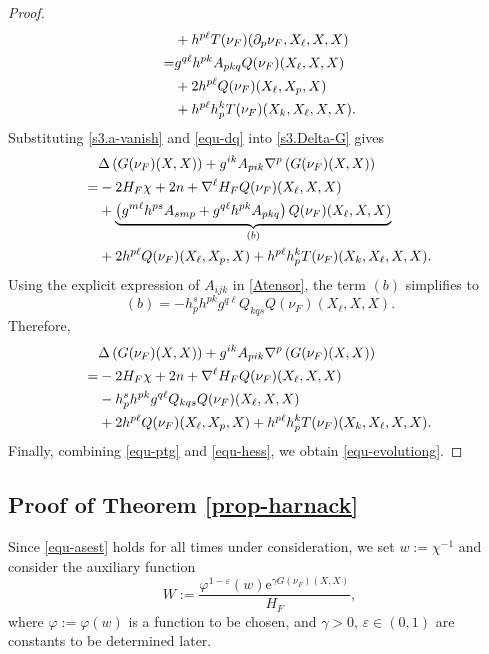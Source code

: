 \documentclass[10pt,a4paper]{amsart}
\numberwithin{equation}{section}
\begin{document}
\begin{proof}
\begin{align}
			&+ h^{p\ell}T(\nu_F)(\partial_p \nu_F,X_{\ell},X,X) \notag\\
			=& g^{q\ell}h^{pk}A_{pkq}Q(\nu_F)(X_{\ell},X,X) \nonumber\\
			&+ 2h^{p\ell}Q(\nu_F)(X_{\ell},X_{p},X) \notag\\
			& + h^{p\ell}h^k_p T(\nu_F)(X_k,X_{\ell},X,X). \label{equ-dq}
		\end{align}
        Substituting \eqref{s3.a-vanish} and \eqref{equ-dq} into \eqref{s3.Delta-G} gives
		\begin{align*}
			& \Delta\left( G(\nu_F)(X,X) \right) + g^{ik}A_{pik}\nabla^p\left( G(\nu_F)(X,X) \right) \notag\\
			=& -2H_F \chi + 2n + \nabla^{\ell}H_F Q(\nu_F)(X_{\ell},X,X) \nonumber\\
			& + \underbrace{\left(g^{m\ell}h^{ps}A_{smp}+g^{q\ell}h^{pk}A_{pkq}\right)Q(\nu_F)(X_{\ell},X,X)}_{(b)} \nonumber\\
			& + 2h^{p\ell}Q(\nu_F)(X_{\ell},X_{p},X) + h^{p\ell}h^k_p T(\nu_F)(X_k,X_{\ell},X,X).
		\end{align*}
		Using the explicit expression of $A_{ijk}$ in \eqref{Atensor}, the term $(b)$ simplifies to
		\begin{equation*}
			(b)	= -h^s_p h^{pk}g^{q\ell} Q_{kqs}Q(\nu_F)(X_{\ell},X,X).
		\end{equation*}
		Therefore,
		\begin{align}
			& \Delta\left( G(\nu_F)(X,X) \right) + g^{ik}A_{pik}\nabla^p\left( G(\nu_F)(X,X) \right) \notag\\
			=& -2H_F \chi + 2n + \nabla^{\ell}H_F Q(\nu_F)(X_{\ell},X,X) \nonumber\\
			& -h^s_p h^{pk}g^{q\ell} Q_{kqs}Q(\nu_F)(X_{\ell},X,X) \nonumber\\
			& + 2h^{p\ell}Q(\nu_F)(X_{\ell},X_{p},X) + h^{p\ell}h^k_p T(\nu_F)(X_k,X_{\ell},X,X). \label{equ-hess}
		\end{align}		
		Finally, combining \eqref{equ-ptg} and \eqref{equ-hess}, we obtain \eqref{equ-evolutiong}. 
	\end{proof}
	
	\subsection{Proof of Theorem \ref{prop-harnack}}
	
		Since \eqref{equ-asest} holds for all times under consideration, we set $w:=\chi^{-1}$ and consider the auxiliary function
		\begin{equation}
			\label{equ-W}
			W:= \dfrac{\varphi^{1-\varepsilon}(w)\mathrm{e}^{\gamma G(\nu_F)(X,X)}}{H_F},
		\end{equation}
		where $\varphi:=\varphi(w)$ is a function to be chosen, and $\gamma>0$, $\varepsilon\in(0,1)$ are constants to be determined later.
		
\end{document}
